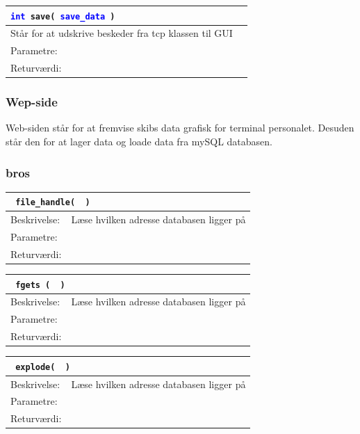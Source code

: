 \begin{table}[H]
\begin{tabular}{l p{12.5cm}}
\multicolumn{2}{l}{\texttt{\textcolor{blue}{int} save( \textcolor{blue}{save\_data} )}} \\
\hline
Står for at udskrive beskeder fra tcp klassen til GUI \\
Parametre: \\
Returværdi:&\\
\end{tabular}
\end{table}

\subsubsection{Wep-side}
Web-siden står for at fremvise skibs data grafisk for terminal personalet. Desuden står den for at lager data og loade data fra mySQL databasen.\\

\subsubsection{bros}

\begin{table}[H]
\begin{tabular}{l p{12.5cm}}
\multicolumn{2}{l}{\texttt{\textcolor{blue}{} file\_handle( \textcolor{blue}{} )}} \\
\hline
Beskrivelse:&Læse hvilken adresse databasen ligger på\\
Parametre:&\\
Returværdi:&\\
\end{tabular}
\end{table}

\begin{table}[H]
\begin{tabular}{l p{12.5cm}}
\multicolumn{2}{l}{\texttt{\textcolor{blue}{} fgets ( \textcolor{blue}{} )}} \\
\hline
Beskrivelse:&Læse hvilken adresse databasen ligger på\\
Parametre:&\\
Returværdi:&\\
\end{tabular}
\end{table}

\begin{table}[H]
\begin{tabular}{l p{12.5cm}}
\multicolumn{2}{l}{\texttt{\textcolor{blue}{} explode( \textcolor{blue}{} )}} \\
\hline
Beskrivelse:&Læse hvilken adresse databasen ligger på\\
Parametre:&\\
Returværdi:&\\
\end{tabular}
\end{table}

